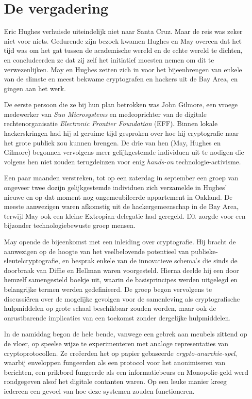 \documentclass[
  a5paper,
  smalldemyvopaper,11pt,twoside,onecolumn,openright,extrafontsizes,
hidelinks]{memoir}
\begin{document}
\section{De vergadering}\label{de-vergadering}

Eric Hughes verhuisde uiteindelijk niet naar Santa Cruz. Maar de reis
was zeker niet voor niets. Gedurende zijn bezoek kwamen Hughes en May
overeen dat het tijd was om het gat tussen de academische wereld en de
echte wereld te dichten, en concludeerden ze dat zij zelf het initiatief
moesten nemen om dit te verwezenlijken. May en Hughes zetten zich in
voor het bijeenbrengen van enkele van de slimste en meest bekwame
cryptografen en hackers uit de Bay Area, en gingen aan het werk.

De eerste persoon die ze bij hun plan betrokken was John Gilmore, een
vroege medewerker van \emph{Sun Microsystems} en medeoprichter van de
digitale rechtenorganisatie \emph{Electronic Frontier Foundation} (EFF).
Binnen lokale hackerskringen had hij al geruime tijd gesproken over hoe
hij cryptografie naar het grote publiek zou kunnen brengen. De drie van
hen (May, Hughes en Gilmore) begonnen vervolgens meer gelijkgestemde
individuen uit te nodigen die volgens hen niet zouden terugdeinzen voor
enig \emph{hands-on} technologie-activisme.

Een paar maanden verstreken, tot op een zaterdag in september een groep
van ongeveer twee dozijn gelijkgestemde individuen zich verzamelde in
Hughes' nieuwe en op dat moment nog ongemeubileerde appartement in
Oakland. De meeste aanwezigen waren afkomstig uit de hackergemeenschap
in de Bay Area, terwijl May ook een kleine Extropian-delegatie had
geregeld. Dit zorgde voor een bijzonder technologiebewuste groep mensen.

May opende de bijeenkomst met een inleiding over cryptografie. Hij
bracht de aanwezigen op de hoogte van het veelbelovende potentieel van
publieke-sleutelcryptografie, en besprak enkele van de innovatieve
schema's die sinds de doorbraak van Diffie en Hellman waren voorgesteld.
Hierna deelde hij een door hemzelf samengesteld boekje uit, waarin de
basisprincipes werden uitgelegd en belangrijke termen werden
gedefinieerd. De groep begon vervolgens te discussiëren over de
mogelijke gevolgen voor de samenleving als cryptografische hulpmiddelen
op grote schaal beschikbaar zouden worden, maar ook de onrustbarende
implicaties van een toekomst zonder dergelijke hulpmiddelen.

In de namiddag begon de hele bende, vanwege een gebrek aan meubels
zittend op de vloer, op speelse wijze te experimenteren met analoge
representaties van cryptoprotocollen. Ze creëerden het op papier
gebaseerde \emph{crypto-anarchie-spel}, waarbij enveloppen fungeerden
als een protocol voor het anonimiseren van berichten, een prikbord
fungeerde als een informatiebeurs en Monopolie-geld werd rondgegeven
alsof het digitale contanten waren. Op een leuke manier kreeg iedereen
een gevoel van hoe deze systemen zouden functioneren.
\end{document}
